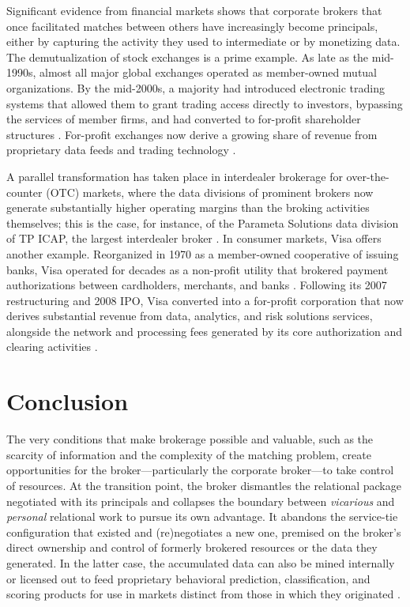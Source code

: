 \documentclass[
]{article}
\begin{document}
Significant evidence from financial markets shows that corporate brokers that once facilitated matches between others have increasingly become principals, either by capturing the activity they used to intermediate or by monetizing data. The demutualization of stock exchanges is a prime example. As late as the mid-1990s, almost all major global exchanges operated as member-owned mutual organizations. By the mid-2000s, a majority had introduced electronic trading systems that allowed them to grant trading access directly to investors, bypassing the services of member firms, and had converted to for-profit shareholder structures \autocite{aggarwalDemutualizationCorporateGovernance2002,petryNationalMarketplacesGlobal2021}. For-profit exchanges now derive a growing share of revenue from proprietary data feeds and trading technology \autocite{mackenzieTradingSpeedLight2021,pardo-guerraAutomatingFinanceInfrastructures2019}.

A parallel transformation has taken place in interdealer brokerage for over-the-counter (OTC) markets, where the data divisions of prominent brokers now generate substantially higher operating margins than the broking activities themselves; this is the case, for instance, of the Parameta Solutions data division of TP ICAP, the largest interdealer broker \autocite{ARA_FullReport}. In consumer markets, Visa offers another example. Reorganized in 1970 as a member-owned cooperative of issuing banks, Visa operated for decades as a non-profit utility that brokered payment authorizations between cardholders, merchants, and banks \autocite{stearnsElectronicValueExchange2011}. Following its 2007 restructuring and 2008 IPO, Visa converted into a for-profit corporation that now derives substantial revenue from data, analytics, and risk solutions services, alongside the network and processing fees generated by its core authorization and clearing activities \autocite{VisaAnnualReport}.

\section{Conclusion}

The very conditions that make brokerage possible and valuable, such as the scarcity of information and the complexity of the matching problem, create opportunities for the broker---particularly the corporate broker---to take control of resources. At the transition point, the broker dismantles the relational package negotiated with its principals and collapses the boundary between \emph{vicarious} and \emph{personal} relational work to pursue its own advantage. It abandons the service-tie configuration that existed and (re)negotiates a new one, premised on the broker's direct ownership and control of formerly brokered resources or the data they generated. In the latter case, the accumulated data can also be mined internally or licensed out to feed proprietary behavioral prediction, classification, and scoring products \autocite{fourcadeSeeingMarket2017,fourcadeOrdinalSociety2024} for use in markets distinct from those in which they originated \autocite{viljoenRelationalTheoryData2021,zuboffAgeSurveillanceCapitalism2019}.
\end{document}
